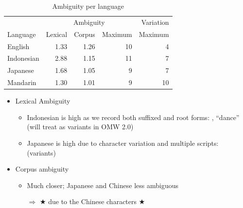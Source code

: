 \documentclass[a4paper,landscape,headrule,footrule,xetex]{foils}
\begin{document}
\begin{table}[tbp]
  \centering
\begin{tabular}{lrrrr}
            & \multicolumn{3}{c}{Ambiguity} & Variation \\
 Language   &   Lexical & Corpus  &   Maximum & Maximum \\
\hline
 English    & 1.33   &    1.26 &              10 &               4 \\
 Indonesian & 2.88   &    1.15 &              11 &               7 \\
 Japanese   & 1.68   &    1.05 &               9 &               7 \\
 Mandarin   & 1.30   &    1.01 &               9 &              10 \\
\end{tabular}
 \caption{Ambiguity per language}
  \label{tab:ambi}
\end{table}
\begin{itemize}\addtolength{\itemsep}{-1.2ex}
\item Lexical Ambiguity
  \begin{itemize}
  \item Indonesian is high as we record both suffixed and root forms: 
    ,  ``dance'' (will treat as variants in OMW
2.0)
\item Japanese is high due to character variation
  and multiple scripts: \\   (variants)
\end{itemize}
\item Corpus ambiguity
  \begin{itemize}
  \item Much closer;  Japanese and Chinese less ambiguous
  \item [$\Rightarrow$] ★ due to the Chinese characters ★%
  \end{itemize}
\end{itemize}
\end{document}
